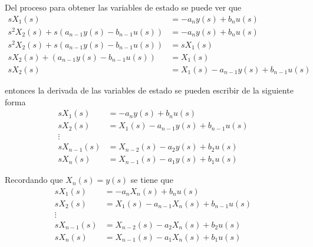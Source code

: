 Del proceso para obtener las variables de estado se puede ver que 
\[
    \begin{split}
        sX_{1}(s) & = -a_{n}y(s)+b_{n}u(s)\\
        s^{2}X_{2}(s)+s(a_{n-1}y(s)-b_{n-1}u(s)) & = -a_{n}y(s)+b_{n}u(s)\\
        s^{2}X_{2}(s)+s(a_{n-1}y(s)-b_{n-1}u(s)) & = sX_{1}(s)\\
        sX_{2}(s)+(a_{n-1}y(s)-b_{n-1}u(s)) & = X_{1}(s)\\
        sX_{2}(s) & = X_{1}(s)-a_{n-1}y(s)+b_{n-1}u(s)
    \end{split}
\]

entonces la derivada de las variables de estado se pueden escribir de la siguiente forma
\[
    \begin{split}
        sX_{1}(s) & = -a_{n}y(s)+b_{n}u(s)\\
        sX_{2}(s) & = X_{1}(s)-a_{n-1}y(s)+b_{n-1}u(s)\\
        \vdots\\
        sX_{n-1}(s) & = X_{n-2}(s)-a_{2}y(s)+b_{2}u(s)\\
        sX_{n}(s) & = X_{n-1}(s)-a_{1}y(s)+b_{1}u(s)
    \end{split}
\]

Recordando que \( X_{n}(s) = y(s) \) se tiene que 
\[
    \begin{split}
        sX_{1}(s) & = -a_{n}X_{n}(s)+b_{n}u(s)\\
        sX_{2}(s) & = X_{1}(s)-a_{n-1}X_{n}(s)+b_{n-1}u(s)\\
        \vdots\\
        sX_{n-1}(s) & = X_{n-2}(s)-a_{2}X_{n}(s)+b_{2}u(s)\\
        sX_{n}(s) & = X_{n-1}(s)-a_{1}X_{n}(s)+b_{1}u(s)
    \end{split}
\]

